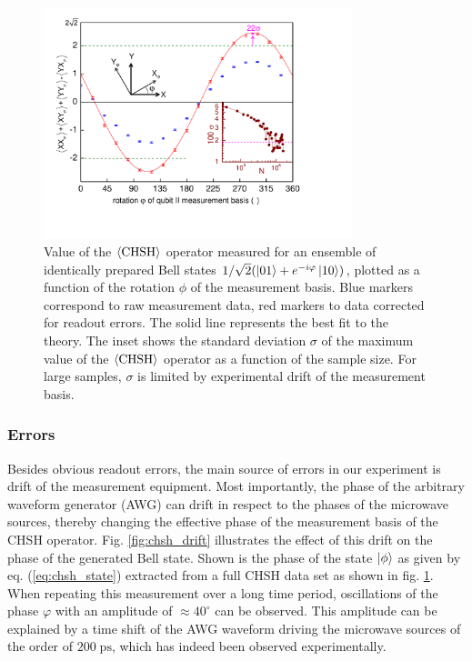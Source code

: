 \begin{figure}[ht!]
	\centering
		\includegraphics[width=0.8\textwidth]{./material/papers/iswap/figures/chsh}
	\caption[]{Value of the $\left< \mathrm{CHSH} \right>$ operator measured for an ensemble of identically prepared Bell states $1/\sqrt{2}(\left| 01 \right>+e^{-i\varphi}\left| 10 \right>)$, plotted as a function of the rotation $\phi$ of the measurement basis. Blue markers correspond to raw measurement data, red markers to data corrected for readout errors. The solid line represents the best fit to the theory. The inset shows the standard deviation $\sigma$ of the maximum value of the $\left< \mathrm{CHSH} \right>$ operator as a function of the sample size. For large samples, $\sigma$ is limited by experimental drift of the measurement basis.}
	\label{fig:chsh}
\end{figure}

\subsubsection{Errors} 

Besides obvious readout errors, the main source of errors in our experiment is drift of the measurement equipment. Most importantly, the phase of the arbitrary waveform generator (AWG) can drift in respect to the phases of the microwave sources, thereby changing the effective phase of the measurement basis of the CHSH operator. Fig. \ref{fig:chsh_drift} illustrates the effect of this drift on the phase of the generated Bell state. Shown is the phase of the state $\left| \phi \right>$ as given by eq. (\ref{eq:chsh_state}) extracted from a full CHSH data set as shown in fig. \ref{fig:chsh}. When repeating this measurement over a long time period, oscillations of the phase $\varphi$ with an amplitude of $\approx 40^\circ$ can be observed. This amplitude can be explained by a time shift of the AWG waveform driving the microwave sources of the order of $200\;\mathrm{ps}$, which has indeed been observed experimentally.

